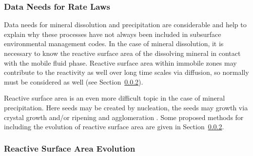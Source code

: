 \subsubsection{Data Needs for Rate Laws}

Data needs for mineral dissolution and precipitation are considerable and help to explain why these processes have not always been included in subsurface environmental management codes.  In the case of mineral dissolution, it is necessary to know the reactive surface area of the dissolving mineral in contact with the mobile fluid phase.  Reactive surface area within immobile zones may contribute to the reactivity as well over long time scales via diffusion, so normally must be considered as well (see Section~\ref{sec:ReactiveSurfaceArea}).  

Reactive surface area is an even more difficult topic in the case of mineral precipitation.  Here seeds may be created by nucleation, the seeds may growth via crystal growth and/or ripening and agglomeration \citep{steefel1990new}.  Some proposed methods for including the evolution of reactive surface area are given in Section~\ref{sec:ReactiveSurfaceArea}.  






\subsubsection{Reactive Surface Area Evolution}  
\label{sec:ReactiveSurfaceArea}

